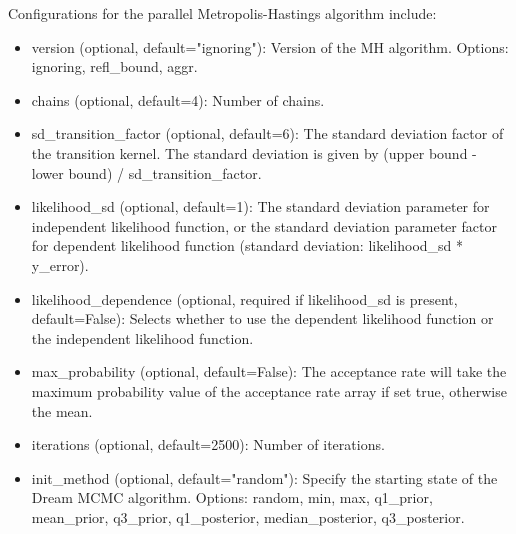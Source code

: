 Configurations for the parallel Metropolis-Hastings algorithm include:
\begin{itemize}
    \item version (optional, default="ignoring"): Version of the MH algorithm. Options: ignoring, refl\_bound, aggr.
    \item chains (optional, default=4): Number of chains.
    \item sd\_transition\_factor (optional, default=6): The
    standard deviation factor of the transition kernel. The standard deviation is given by (upper bound - lower bound) / sd\_transition\_factor.
    \item likelihood\_sd (optional, default=1): The standard deviation parameter for independent likelihood function, or the standard deviation parameter factor for dependent likelihood function (standard deviation: likelihood\_sd * y\_error).
    \item likelihood\_dependence (optional, required if likelihood\_sd is present, default=False): Selects whether to use the dependent likelihood function or the independent likelihood function.
    \item max\_probability (optional, default=False): The acceptance rate will take the maximum probability value of the acceptance rate array if set true, otherwise the mean.
    \item iterations (optional, default=2500): Number of iterations.
    \item init\_method (optional, default="random"): Specify the starting state of the Dream MCMC algorithm. Options: random, min, max, q1\_prior, mean\_prior, q3\_prior, q1\_posterior, median\_posterior, q3\_posterior.
\end{itemize}

